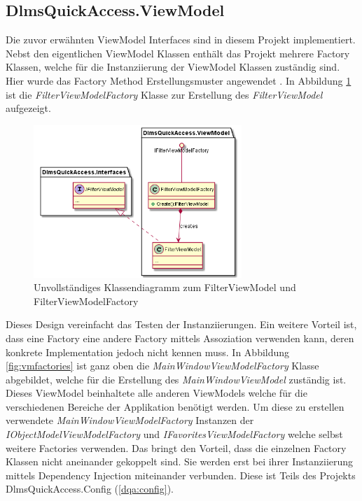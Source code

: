 \subsection{DlmsQuickAccess.ViewModel}
Die zuvor erwähnten ViewModel Interfaces sind in diesem Projekt implementiert.
Nebst den eigentlichen ViewModel Klassen enthält das Projekt mehrere Factory Klassen, welche für die Instanziierung der ViewModel Klassen zuständig sind.
Hier wurde das Factory Method Erstellungsmuster angewendet \parencite{designPatterns}.
In Abbildung \ref{fig:filterViewModel} ist die \textit{FilterViewModelFactory} Klasse zur Erstellung des \textit{FilterViewModel} aufgezeigt.
\begin{figure}[H]
   \centering
   \includegraphics[width=0.7\textwidth]{gfx/Filter ViewModel.png}
   \caption{
      Unvollständiges Klassendiagramm zum FilterViewModel und FilterViewModelFactory
      }
      \label{fig:filterViewModel}
\end{figure}

Dieses Design vereinfacht das Testen der Instanziierungen.
Ein weitere Vorteil ist, dass eine Factory eine andere Factory mittels Assoziation verwenden kann, deren konkrete Implementation jedoch nicht kennen muss.
In Abbildung \ref{fig:vmfactories} ist ganz oben die \textit{MainWindowViewModelFactory} Klasse abgebildet, welche für die Erstellung des \textit{MainWindowViewModel} zuständig ist.
Dieses ViewModel beinhaltete alle anderen ViewModels welche für die verschiedenen Bereiche der Applikation benötigt werden.
Um diese zu erstellen verwendete \textit{MainWindowViewModelFactory} Instanzen der \textit{IObjectModelViewModelFactory} und \textit{IFavoritesViewModelFactory} welche selbst weitere Factories verwenden.
Das bringt den Vorteil, dass die einzelnen Factory Klassen nicht aneinander gekoppelt sind.
Sie werden erst bei ihrer Instanziierung mittels Dependency Injection miteinander verbunden.
Diese ist Teils des Projekts DlmsQuickAccess.Config (\ref{dqa:config}).
   
